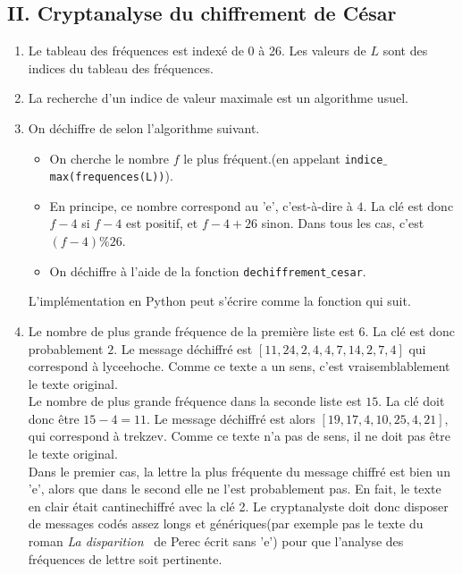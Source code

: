 \subsection*{II. Cryptanalyse du chiffrement de César}
\begin{enumerate}
\item Le tableau des fréquences est indexé de 0 à 26. Les valeurs de $L$ sont des indices du tableau des fréquences. 


\item La recherche d'un indice de valeur maximale est un algorithme usuel.


\item On déchiffre de selon l'algorithme suivant.
\begin{itemize}
 \item On cherche le nombre $f$ le plus fréquent.\newline (en appelant \texttt{indice$\_$max(frequences(L))}).
 \item En principe, ce nombre correspond au 'e', c'est-à-dire à $4$. La clé est donc $f-4$ si $f-4$ est positif, et $f-4+26$ sinon. Dans tous les cas, c'est $(f-4) \% 26$.
 \item On déchiffre à l'aide de la fonction \texttt{dechiffrement$\_$cesar}.
\end{itemize}
L'implémentation en Python peut s'écrire comme la fonction qui suit.


\item Le nombre de plus grande fréquence de la première liste est $6$. La clé est donc probablement $2$. Le message déchiffré est $[11,24,2,4,4,7,14,2,7,4]$ qui correspond à \og lyceehoche\fg. Comme ce texte a un sens, c'est vraisemblablement le texte original.\\
Le nombre de plus grande fréquence dans la seconde liste est $15$. La clé doit donc être $15-4=11$. \newline
Le message déchiffré est alors $[19,17,4,10,25,4,21]$, qui correspond à \og trekzev\fg. Comme ce texte n'a pas de sens, il ne doit pas être le texte original.\\
Dans le premier cas, la lettre la plus fréquente du message chiffré est bien un 'e', alors que dans le second elle ne l'est probablement pas.\newline
En fait, le texte en clair était \og cantine\fg chiffré avec la clé 2.\newline
Le cryptanalyste doit donc disposer de messages codés assez longs et \og génériques\fg (par exemple pas le texte du roman \og\emph{ La disparition}\fg~ de Perec écrit sans 'e') pour que l'analyse des fréquences de lettre soit pertinente.
\end{enumerate}

